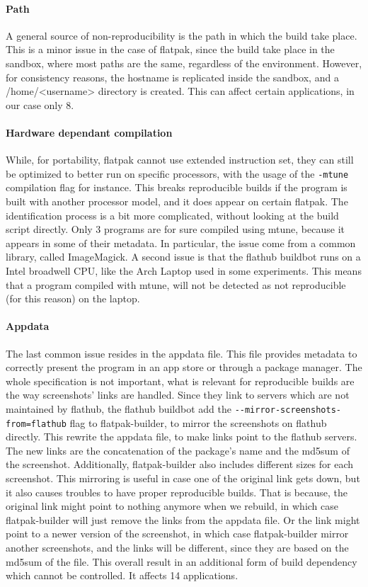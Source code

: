 \documentclass[a4paper,11pt,oneside]{report}
\theoremstyle{definition}
\newcommand{\rb}{reproducible builds\xspace}
\newcommand{\fp}{flatpak\xspace}
\newcommand{\fh}{flathub\xspace}
\newcommand{\fb}{flatpak-builder\xspace}
\newcommand{\fhbb}{flathub buildbot\xspace}
\begin{document}
\paragraph*{Path}
A general source of non-reproducibility is the path in which the build take
place. This is a minor issue in the case of \fp, since the build take
place in the sandbox, where most paths are the same, regardless of the
environment. However, for consistency reasons, the hostname is replicated
inside the sandbox, and a /home/<username> directory is created. This can
affect certain applications, in our case only 8.

\paragraph*{Hardware dependant compilation}
While, for portability, \fp cannot use extended instruction set, they can still
be optimized to better run on specific processors, with the usage of the
\verb|-mtune| compilation flag for instance. This breaks \rb if the program is
built with another processor model, and it does appear on certain \fp. The
identification process is a bit more complicated, without looking at the build
script directly. Only 3 programs are for sure compiled using mtune, because it
appears in some of their metadata. In particular, the issue come from a common
library, called ImageMagick. A second issue is that the \fhbb runs on a Intel
broadwell CPU, like the Arch Laptop used in some experiments. This means that a
program compiled with mtune, will not be detected as not reproducible (for this
reason) on the laptop.

\paragraph*{Appdata}
The last common issue resides in the appdata file. This file provides metadata
to correctly present the program in an app store or through a package manager.
The whole specification is not important, what is relevant for \rb are the way
screenshots' links are handled. Since they link to servers which are not
maintained by \fh, the \fhbb add the \verb|--mirror-screenshots-from=flathub|
flag to \fb, to mirror the screenshots on \fh directly. This rewrite the
appdata file, to make links point to the \fh servers. The new links are the
concatenation of the package's name and the md5sum of the screenshot.
Additionally, \fb also includes different sizes for each screenshot. This
mirroring is useful in case one of the original link gets down, but it also
causes troubles to have proper \rb. That is because, the original link might
point to nothing anymore when we rebuild, in which case \fb will just remove
the links from the appdata file. Or the link might point to a newer version of
the screenshot, in which case \fb mirror another screenshots, and the links
will be different, since they are based on the md5sum of the file. This overall
result in an additional form of build dependency which cannot be controlled.
It affects 14 applications.
\end{document}
